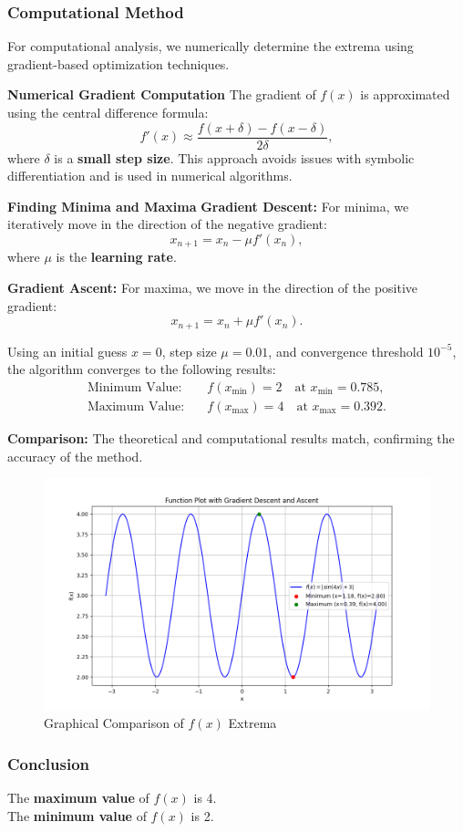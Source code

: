 \documentclass{beamer}
\begin{document}
\begin{frame}
\frametitle{Computational Method}
For computational analysis, we numerically determine the extrema using gradient-based optimization techniques.  
\newline

\textbf{Numerical Gradient Computation}
\newline
The gradient of \(f(x)\) is approximated using the central difference formula:
\[
f'(x) \approx \frac{f(x + \delta) - f(x - \delta)}{2\delta},
\]
where \textbf{\(\delta\)} is a \textbf{small step size}. This approach avoids issues with symbolic differentiation and is used in numerical algorithms.
\newline

\textbf{ Finding Minima and Maxima}
\newline
\textbf{Gradient Descent:} For minima, we iteratively move in the direction of the negative gradient:
\[
x_{n+1} = x_n - \mu f'(x_n),
\]
where \textbf{\(\mu\)} is the \textbf{learning rate}.
\end{frame}
\begin{frame}
\textbf{Gradient Ascent:} For maxima, we move in the direction of the positive gradient:
\[
x_{n+1} = x_n + \mu f'(x_n).
\]


Using an initial guess \(x = 0\), step size \(\mu = 0.01\), and convergence threshold \(10^{-5}\), the algorithm converges to the following results:
\begin{align*}
\text{Minimum Value:} & \quad f(x_{\text{min}}) = 2 \quad \text{at } x_{\text{min}} = 0.785, \\
\text{Maximum Value:} & \quad f(x_{\text{max}}) = 4 \quad \text{at } x_{\text{max}} = 0.392.
\end{align*}

\textbf{Comparison:}
The theoretical and computational results match, confirming the accuracy of the method.
\end{frame}

\begin{frame}
\begin{figure}[h!]
   \centering
   \includegraphics[width=0.7\columnwidth]{figs/fig.png}
   \caption{Graphical Comparison of \(f(x)\) Extrema}
\end{figure}
\end{frame}

\begin{frame}[allowframebreaks]
\frametitle{Conclusion}
The \textbf{maximum value} of \(f(x)\) is 4.\\  
The \textbf{minimum value} of \(f(x)\) is 2.  
\newline

\end{frame}
\end{document}
